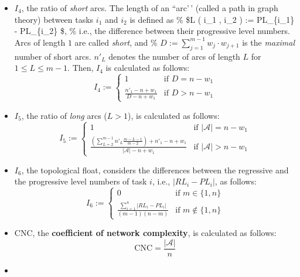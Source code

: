 \documentclass[preprint,
3p]{elsarticle} %
\begin{document}
\begin{appendices}
\begin{itemize}
\item
  \(I_4\), the ratio of \textit{short} arcs. The length of an ``arc'\,'
  (called a path in graph theory) between tasks \(i_1\) and \(i_2\) is
  defined as \% \quad \$L ( i\_1 , i\_2 ) := \textbar{} PL\_\{i\_1\} -
  PL\_\{i\_2\} \textbar{} \$, \% \quad i.e., the difference between
  their progressive level numbers. Arcs of length \(1\) are called
  \textit{short}, and \%
  \quad \(D:=\sum\limits_{j=1}^{m-1}{w_j}\cdot{w_{j+1}}\) is the
  \textit{maximal} number of short arcs. \(n'_L\) denotes the number of
  arcs of length \(L\) for \(1\leq L \leq m-1\). Then, \(I_4\) is
  calculated as follows: \begin{equation}
  \label{eq:I4}
    I_4:=\begin{cases} 1 & \text{if $D = n - w_1$} \\ \frac{n'_1-n+w_1}{D-n+w_1} & \text{if $D > n - w_1$}\end{cases}
  \end{equation}
\item
  \(I_5\), the ratio of \emph{long} arcs (\(L>1\)), is calculated as
  follows: \begin{equation}
  \label{eq:I5}
    I_5:=\begin{cases} 1 & \text{if $| \mathcal{A} | = n - w_1$} \\ \frac{\left(\sum\limits_{L=2}^{m-1}n'_L\frac{m-L-1}{m-2}\right)+n'_1-n+w_1}{| \mathcal{A} |-n+w_1} & \text{if $| \mathcal{A} |  > n - w_1$}\end{cases}
  \end{equation}
\item
  \(I_6\), the topological float, considers the differences between the
  regressive and the progressive level numbers of task \(i\), i.e.,
  \(|RL_i -PL_i|\), as follows: \begin{equation}
  \label{eq:I6}
    I_6:=\begin{cases} 0 & \text{if $m \in{\{1,n\}}$} \\ \frac{\sum\limits_{i=1}^{n} | RL_i-PL_i |} {(m-1)(n-m)}& \text{if $m \notin{\{1,n\}}$}\end{cases}
  \end{equation}
\item
  CNC, the \textbf{coefficient of network complexity}, is calculated as
  follows: \begin{equation}
  \label{eq:cnc}
  \text{CNC}=\frac{|\mathcal{A}|}{n}
  \end{equation}
\item

\end{itemize}
\end{appendices}
\end{document}
